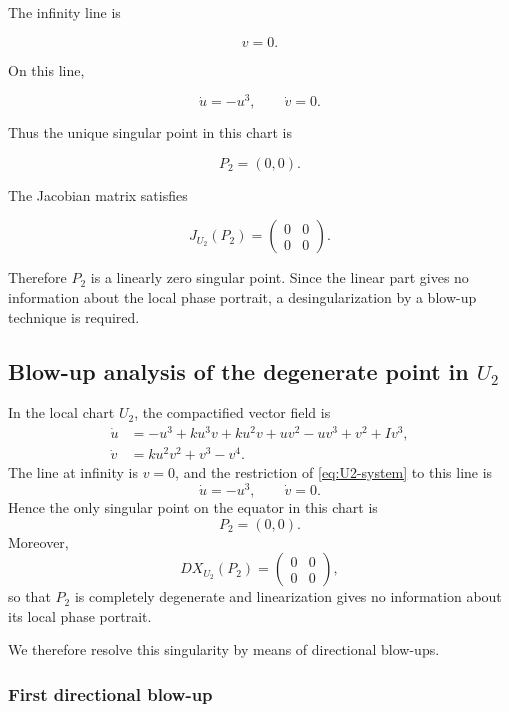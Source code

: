 \documentclass[11pt,reqno]{amsart}
\theoremstyle{plain}
\theoremstyle{definition}
\theoremstyle{remark}
\begin{document}
The infinity line is

\[
v=0 .
\]

On this line,

\[
\dot u=-u^3,\qquad \dot v=0 .
\]

Thus the unique singular point in this chart is

\[
P_2=(0,0).
\]

The Jacobian matrix satisfies

\[
J_{U_2}(P_2)=
\begin{pmatrix}
0&0\\
0&0
\end{pmatrix}.
\]

Therefore \(P_2\) is a linearly zero singular point. Since the linear
part gives no information about the local phase portrait, a
desingularization by a blow-up technique is required.

\subsection{Blow-up analysis of the degenerate point in $U_2$}
\label{subsec:blowup-U2}

In the local chart $U_2$, the compactified vector field is
\begin{equation}
\label{eq:U2-system}
\begin{aligned}
\dot u
&=
-u^3
+ku^3v
+ku^2v
+uv^2
-uv^3
+v^2
+Iv^3,
\\
\dot v
&=
ku^2v^2+v^3-v^4.
\end{aligned}
\end{equation}
The line at infinity is $v=0$, and the restriction of
\eqref{eq:U2-system} to this line is
\[
\dot u=-u^3,
\qquad
\dot v=0.
\]
Hence the only singular point on the equator in this chart is
\[
P_2=(0,0).
\]
Moreover,
\[
D X_{U_2}(P_2)
=
\begin{pmatrix}
0&0\\
0&0
\end{pmatrix},
\]
so that $P_2$ is completely degenerate and linearization gives no
information about its local phase portrait.

We therefore resolve this singularity by means of directional blow-ups.

\subsubsection{First directional blow-up}
\end{document}
